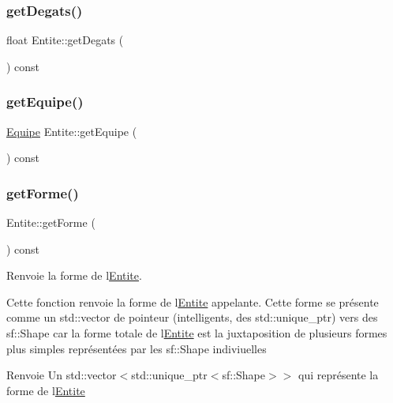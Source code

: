 \mbox{\label{class_entite_a4e2706d31025034b76fb5aa6bc4f82a9}} 
\subsubsection{\texorpdfstring{get\+Degats()}{getDegats()}}
{\footnotesize\ttfamily float Entite\+::get\+Degats (\begin{DoxyParamCaption}{ }\end{DoxyParamCaption}) const}

\mbox{\label{class_entite_a44612e23e1c45af3e865fa039875df1e}} 
\subsubsection{\texorpdfstring{get\+Equipe()}{getEquipe()}}
{\footnotesize\ttfamily \hyperlink{constantes_8h_a08fa5554288d5031a8f3bb83cc04ee83}{Equipe} Entite\+::get\+Equipe (\begin{DoxyParamCaption}{ }\end{DoxyParamCaption}) const\hspace{0.3cm}{\ttfamily [inline]}}

\mbox{\label{class_entite_ad7314f276ea1808e98cfd8b7d0e900c8}} 
\subsubsection{\texorpdfstring{get\+Forme()}{getForme()}}
{\footnotesize\ttfamily Entite\+::get\+Forme (\begin{DoxyParamCaption}{ }\end{DoxyParamCaption}) const\hspace{0.3cm}{\ttfamily [inline]}}



Renvoie la forme de l\textquotesingle{}\hyperlink{class_entite}{Entite}. 

Cette fonction renvoie la forme de l\textquotesingle{}\hyperlink{class_entite}{Entite} appelante. Cette forme se présente comme un {\ttfamily std\+::vector} de pointeur (intelligents, des {\ttfamily std\+::unique\+\_\+ptr}) vers des {\ttfamily sf\+::\+Shape} car la forme totale de l\textquotesingle{}\hyperlink{class_entite}{Entite} est la juxtaposition de plusieurs formes plus simples représentées par les {\ttfamily sf\+::\+Shape} indiviuelles \begin{DoxyReturn}{Renvoie}
Un {\ttfamily std\+::vector$<$std\+::unique\+\_\+ptr$<$sf\+::\+Shape$>$$>$} qui représente la forme de l\textquotesingle{}\hyperlink{class_entite}{Entite} 
\end{DoxyReturn}
\mbox{\label{class_entite_af607aa77e0ce2f6afa3cf8fdd073b9cf}} 
